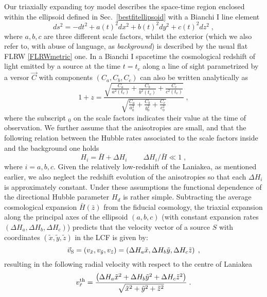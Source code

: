 \documentclass[notitlepage,nofootinbib]{revtex4-1}
\begin{document}
Our triaxially expanding toy model describes the space-time region enclosed within the ellipsoid defined in Sec.~\ref{bestfitellipsoid} with a Bianchi I line element 
\begin{equation}
    ds^2= -dt^2 + a(t)^2dx^2 + b(t)^2dy^2 + c(t)^2dz^2\;,
\end{equation}
where $a,b,c$ are three different scale factors, whilst the exterior (which we also refer to, with abuse of language, as \textit{background}) is described by the usual flat FLRW \eqref{FLRWmetric} one. In a Bianchi I spacetime the cosmological redshift of light emitted by a source at the time $t=t_e$ along a line of sight parametrized by a versor $\vec{C}$ with components $\left(C_a,C_b,C_c\right)$  can also be written analytically as \cite{Schucker:2014wca}
\begin{equation}\label{redBI}
    1+z = \frac{\sqrt{\frac{C_a}{a^2(t_e)} + \frac{C_b}{b^2(t_e)} + \frac{C_c}{c^2(t_e)}}}{\sqrt{\frac{C_a}{a_0^2} + \frac{C_b}{b_0^2} + \frac{C_c}{c_0^2}}}\;,
\end{equation}
where the subscript $_0$ on the scale factors indicates their value at the time of observation.
We further assume that the anisotropies are small, and that the following relation between the Hubble rates associated to the scale factors inside and the background one holds
\begin{equation}
    H_i= \bar{H} + \Delta H_i \qquad\ \Delta H_i/\bar{H} \ll 1 \;, 
\end{equation}
where $i=a,b,c$.
Given the relatively low-redshift of the Laniakea, as mentioned earlier, we also neglect the redshift evolution of the anisotropies so that each $\Delta H_i$ is approximately constant.
Under these assumptions the functional dependence of the directional Hubble parameter $H_d$ is rather simple. Subtracting the average cosmological expansion $\bar{H}(\bar{z})$ from the fiducial cosmology, the triaxial expansion along the principal axes of the ellipsoid $(a,b,c)$ (with constant expansion rates $(\Delta H_a, \Delta H_b, \Delta H_c)$)  predicts that the velocity vector of a source $S$ with coordinates $(\tilde{x},\tilde{y},\tilde{z})$ in the LCF is given by:
\begin{equation}
    \vec{v}_{\rm{S}} = \left(v_{\tilde{x}},v_{\tilde{y}},v_{\tilde{z}}\right) = \left(\Delta H_a \tilde{x}, \Delta H_b \tilde{y}, \Delta H_c \tilde{z} \right)\;,
\end{equation}
resulting in the following radial velocity with respect to the centre of Laniakea
\begin{equation}\label{theovr}
    v_{\tilde{r}}^{\rm{th}} = \frac{\left(\Delta H_a \tilde{x}^2 +\Delta H_b\tilde{y}^2 +\Delta H_c\tilde{z}^2 \right)}{\sqrt{\tilde{x}^2 + \tilde{y}^2 +\tilde{z}^2}}\;.
\end{equation}
\end{document}
